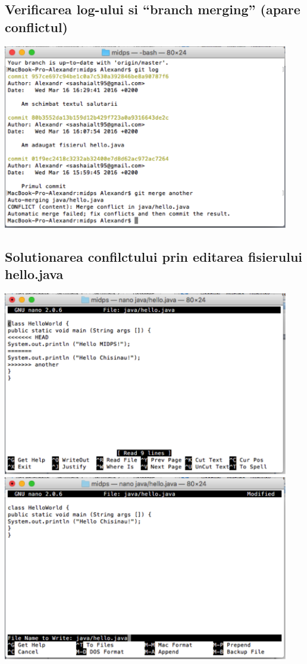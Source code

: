 \documentclass[12pt]{article}
\begin{document}
\subsection{Verificarea log-ului si “branch merging” (apare conflictul)}
\includegraphics[width=12.5cm]{images/23}
\subsection{Solutionarea confilctului prin editarea fisierului hello.java}
\includegraphics[width=12.5cm]{images/24}\\
\includegraphics[width=12.5cm]{images/25}
\end{document}
